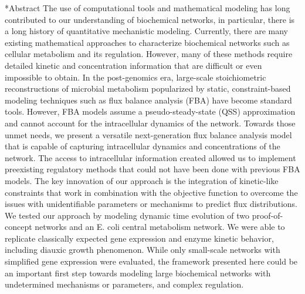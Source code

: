 \documentclass[12pt]{article}
\makeatletter
\renewcommand\section{\@startsection
	{subsection}{2}{0mm}
	{-0.2in}
	{0.05\baselineskip}
	{\normalfont\large\bfseries}}
\makeatother
\begin{document}
\section*{Abstract}
The use of computational tools and mathematical modeling has long contributed to our understanding of biochemical networks, in particular, there is a long history of quantitative mechanistic modeling. Currently, there are many existing mathematical approaches to characterize biochemical networks such as cellular metabolism and its regulation. However, many of these methods require detailed kinetic and concentration information that are difficult or even impossible to obtain. In the post-genomics era, large-scale stoichiometric reconstructions of microbial metabolism popularized by static, constraint-based modeling techniques such as flux balance analysis (FBA) have become standard tools. However, FBA models assume a pseudo-steady-state (QSS) approximation and cannot account for the intracellular dynamics of the network. Towards those unmet needs, we present a versatile next-generation flux balance analysis model that is capable of capturing intracellular dynamics and concentrations of the network. The access to intracellular information created allowed us to implement preexisting regulatory methods that could not have been done with previous FBA models. The key innovation of our approach is the integration of kinetic-like constraints that work in combination with the objective function to overcome the issues with unidentifiable parameters or mechanisms to predict flux distributions. We tested our approach by modeling dynamic time evolution of two proof-of-concept networks and an E. coli central metabolism network. We were able to replicate classically expected gene expression and enzyme kinetic behavior, including diauxic growth phenomenon. While only small-scale networks with simplified gene expression were evaluated, the framework presented here could be an important first step towards modeling large biochemical networks with undetermined mechanisms or parameters, and complex regulation.


\end{document}
